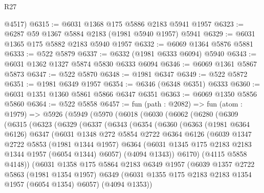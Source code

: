 \begin{lexlean}{R27}
\begin{coremodule}
      @4517)
@6315 := @6031 @1368 @175 @5886 @2183 @5941 @1957
@6323 := @6287 @59 @1367 @5884 @2183 (@1981 @5940 @1957) @5941
@6329 := @6031 @1365 @175 @5882 @2183 @5940 @1957
@6332 := @6069 @1364 @5876 @5881
@6333 := @522 @5879
@6337 := @6332 (@1981 @6333 @6094) @5940
@6343 := @6031 @1362 @1327 @5874 @5830 @6333 @6094
@6346 := @6069 @1361 @5867 @5873
@6347 := @522 @5870
@6348 := @1981 @6347
@6349 := @522 @5872
@6351 := @1981 @6349 @1957
@6354 := @6346 (@6348 @6351) @6333
@6360 := @6031 @1351 @1360 @5861 @5866 @6347 @6351
@6363 := @6069 @1350 @5856 @5860
@6364 := @522 @5858
@6457 := fun (path : @2082) =>
  fun (atom : @1979) =>
  @5926
    (@5949
      (@5970
        (@6018
          (@6030
            (@6062
              (@6280
                (@6309
                  (@6315
                    (@6323
                      (@6329
                        (@6337
                          (@6343
                            (@6354
                              (@6360
                                (@6363
                                  (@1981 @6364 @6126)
                                  @6347
                                  (@6031
                                    @1348
                                    @272
                                    @5854
                                    @2722
                                    @6364
                                    @6126
                                    (@6039
                                      @1347
                                      @2722
                                      @5853
                                      (@1981 @1344 @1957)
                                      @6364
                                      (@6031 @1345 @175 @2183 @2183 @1344 @1957 (@6054 @1344) @6057)
                                      (@4094 @1343))
                                    @6170)
                                  (@4115 @5858 @4148))
                                (@6031
                                  @1358
                                  @175
                                  @5864
                                  @2183
                                  @6349
                                  @1957
                                  (@6039
                                    @1357
                                    @2722
                                    @5863
                                    (@1981 @1354 @1957)
                                    @6349
                                    (@6031 @1355 @175 @2183 @2183 @1354 @1957 (@6054 @1354) @6057)
                                    (@4094 @1353))

\end{coremodule}
\end{lexlean}
